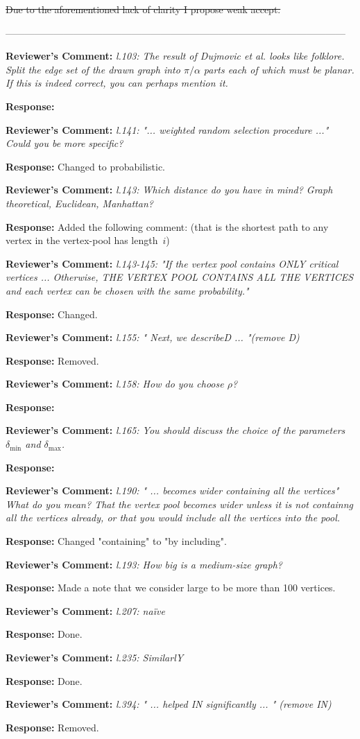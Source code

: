 \documentclass{article}
\newcommand{\rcomment}[1]{\vspace{0.3cm} \item \textbf{Reviewer's Comment:} {\em #1}}
\newcommand{\tcomment}[1]{\vspace{0.3cm} {\color{red} \item \textbf{Reviewer's Comment:} {\em #1}}}
\newcommand{\response}{\vspace{0.2cm} \textbf{Response: }}
\begin{document}
\st{Due to the aforementioned lack of clarity I propose weak accept.}


---------------------------------------------------------------------------------------------------------

\begin{itemize}

\rcomment{l.103: The result of Dujmovic et al. looks like folklore. Split the edge set of the drawn graph into $\pi/\alpha$ parts each of which must be planar. If this is indeed correct, you can perhaps mention it.}

\response{}

\rcomment{l.141: "... weighted random selection procedure ..." Could you be more specific?}

\response{Changed to probabilistic.}

\rcomment{l.143: Which distance do you have in mind? Graph theoretical, Euclidean, Manhattan?}

\response{Added the following comment: (that is the shortest path to any vertex in the vertex-pool has length~$i$)}

\rcomment{l.143-145: "If the vertex pool contains ONLY critical vertices ... Otherwise, THE VERTEX POOL CONTAINS ALL THE VERTICES and each vertex can be chosen with the same probability." }

\response{Changed.}

\rcomment{l.155: " Next, we describeD ...  "(remove D)}

\response{Removed.}

\tcomment{l.158: How do you choose $\rho$?}

\response{}

\tcomment{l.165: You should discuss the choice of the parameters $\delta_{\min}$ and $\delta_{\max} $.}

\response{}

\rcomment{l.190: " ... becomes wider containing all the vertices" What do you mean?  That the vertex pool becomes wider unless it is not containng all the vertices already, or that you would include all the vertices into the pool.}

\response{Changed "containing" to "by including".}

\rcomment{l.193: How big is a medium-size graph?}

\response{Made a note that we consider large to be more than 100 vertices.}

\rcomment{l.207: na\"ive}

\response{Done.}

\rcomment{l.235: SimilarlY}

\response{Done.}

\rcomment{l.394: " ... helped IN significantly ... " (remove IN)}

\response{Removed.}

\end{itemize}
\newpage
\end{document}
